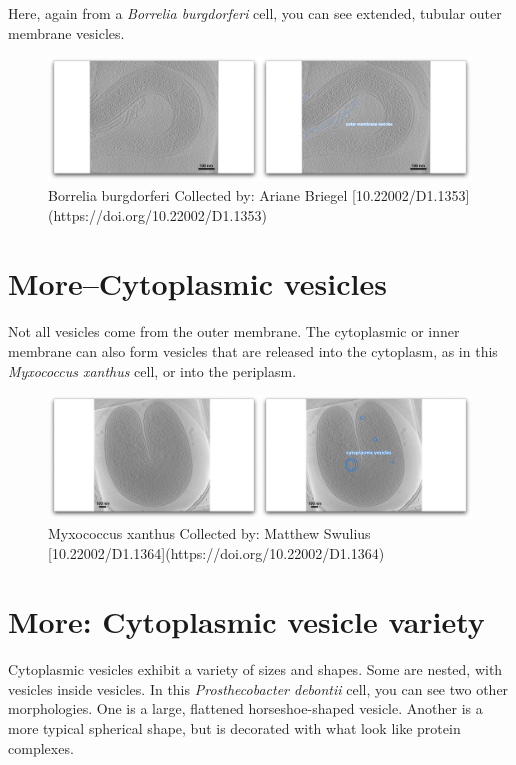 \documentclass[]{tufte-book}
\begin{document}
Here, again from a \emph{Borrelia burgdorferi} cell, you can see
extended, tubular outer membrane vesicles.

\begin{figure}
\includegraphics{movie_stills/2_4b} \caption[Borrelia burgdorferi Collected by]{Borrelia burgdorferi Collected by: Ariane Briegel [10.22002/D1.1353](https://doi.org/10.22002/D1.1353)}\label{fig:unnamed-chunk-29}
\end{figure}

\hypertarget{morecytoplasmic-vesicles}{\section{More--Cytoplasmic
vesicles}\label{morecytoplasmic-vesicles}}

Not all vesicles come from the outer membrane. The cytoplasmic or inner
membrane can also form vesicles that are released into the cytoplasm, as
in this \emph{Myxococcus xanthus} cell, or into the periplasm.

\begin{figure}
\includegraphics{movie_stills/2_4c} \caption[Myxococcus xanthus Collected by]{Myxococcus xanthus Collected by: Matthew Swulius [10.22002/D1.1364](https://doi.org/10.22002/D1.1364)}\label{fig:unnamed-chunk-30}
\end{figure}

\section{More: Cytoplasmic vesicle
variety}\label{more-cytoplasmic-vesicle-variety}

Cytoplasmic vesicles exhibit a variety of sizes and shapes. Some are
nested, with vesicles inside vesicles. In this \emph{Prosthecobacter
debontii} cell, you can see two other morphologies. One is a large,
flattened horseshoe-shaped vesicle. Another is a more typical spherical
shape, but is decorated with what look like protein complexes.
\end{document}
